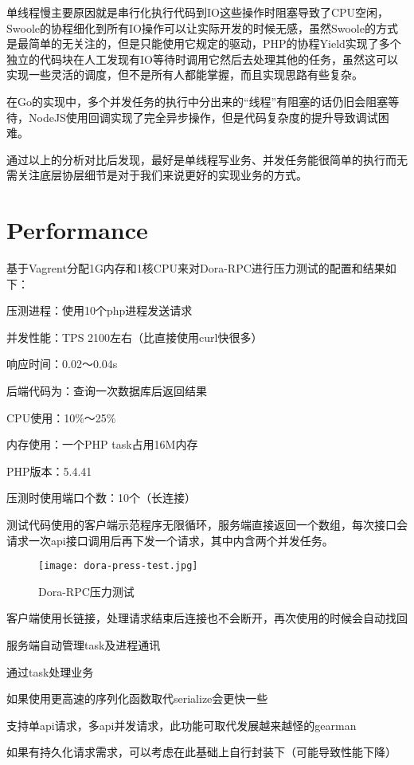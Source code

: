 单线程慢主要原因就是串行化执行代码到IO这些操作时阻塞导致了CPU空闲，Swoole的协程细化到所有IO操作可以让实际开发的时候无感，虽然Swoole的方式是最简单的无关注的，但是只能使用它规定的驱动，PHP的协程Yield实现了多个独立的代码块在人工发现有IO等待时调用它然后去处理其他的任务，虽然这可以实现一些灵活的调度，但不是所有人都能掌握，而且实现思路有些复杂。

在Go的实现中，多个并发任务的执行中分出来的“线程”有阻塞的话仍旧会阻塞等待，NodeJS使用回调实现了完全异步操作，但是代码复杂度的提升导致调试困难。

通过以上的分析对比后发现，最好是单线程写业务、并发任务能很简单的执行而无需关注底层协层细节是对于我们来说更好的实现业务的方式。


\section{Performance}

基于Vagrent分配1G内存和1核CPU来对Dora-RPC进行压力测试的配置和结果如下：

\begin{compactitem}
\item 压测进程：使用10个php进程发送请求
\item 并发性能：TPS 2100左右（比直接使用curl快很多）
\item 响应时间：0.02～0.04s
\item 后端代码为：查询一次数据库后返回结果
\item CPU使用：10\%～25\%
\item 内存使用：一个PHP task占用16M内存
\item PHP版本：5.4.41
\item 压测时使用端口个数：10个（长连接）
\end{compactitem}

测试代码使用的客户端示范程序无限循环，服务端直接返回一个数组，每次接口会请求一次api接口调用后再下发一个请求，其中内含两个并发任务。

\begin{figure}[htbp]
\centering
\texttt{[image: dora-press-test.jpg]}
\caption{Dora-RPC压力测试}
\end{figure}

\begin{compactitem}
\item 客户端使用长链接，处理请求结束后连接也不会断开，再次使用的时候会自动找回
\item 服务端自动管理task及进程通讯
\item 通过task处理业务
\item 如果使用更高速的序列化函数取代serialize会更快一些
\item 支持单api请求，多api并发请求，此功能可取代发展越来越怪的gearman
\item 如果有持久化请求需求，可以考虑在此基础上自行封装下（可能导致性能下降）
\end{compactitem}

